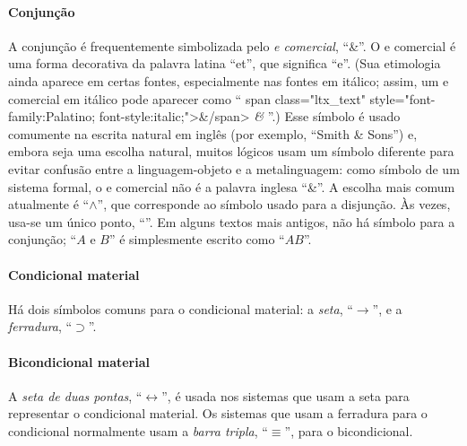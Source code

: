 \paragraph{Conjunção}
A conjunção é frequentemente simbolizada pelo \emph{e comercial}, \textquotedblleft {\&}\textquotedblright{}. O e comercial é uma forma decorativa da palavra latina \textquotedblleft et\textquotedblright{}, que significa \textquotedblleft e\textquotedblright{}. (Sua etimologia ainda aparece em certas fontes, especialmente nas fontes em itálico; assim, um e comercial em itálico pode aparecer como \textquotedblleft%
\iflatexml
\<span class="ltx\_text" style="font-family:Palatino; font-style:italic;">\&\</span>
\else
\emph{\&}
\fi
\textquotedblright{}.) Esse símbolo é usado comumente na escrita natural em inglês (por exemplo, \textquotedblleft Smith \& Sons\textquotedblright{}) e, embora seja uma escolha natural, muitos lógicos usam um símbolo diferente para evitar confusão entre a linguagem-objeto e a metalinguagem: como símbolo de um sistema formal, o e comercial não é a palavra inglesa \textquotedblleft \&\textquotedblright{}. A escolha mais comum atualmente é \textquotedblleft $\wedge$\textquotedblright{}, que corresponde ao símbolo usado para a disjunção. Às vezes, usa-se um único ponto, \textquotedblleft {\scriptsize\textbullet}\textquotedblright{}. Em alguns textos mais antigos, não há símbolo para a conjunção; \textquotedblleft $A$ e $B$\textquotedblright{} é simplesmente escrito como \textquotedblleft $AB$\textquotedblright{}.

\paragraph{Condicional material} Há dois símbolos comuns para o condicional material: a \emph{seta}, \textquotedblleft $\rightarrow$\textquotedblright{}, e a \emph{ferradura}, \textquotedblleft $\supset$\textquotedblright{}.

\paragraph{Bicondicional material} A \emph{seta de duas pontas}, \textquotedblleft $\leftrightarrow$\textquotedblright{}, é usada nos sistemas que usam a seta para representar o condicional material. Os sistemas que usam a ferradura para o condicional normalmente usam a \emph{barra tripla}, \textquotedblleft $\equiv$\textquotedblright{}, para o bicondicional.

